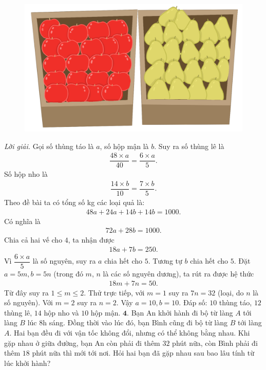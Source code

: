 \begin{multicols}{2}
	\begin{figure}[H]
		\centering
		\vspace*{-5pt}
		\captionsetup{labelformat= empty, justification=centering}
		\includegraphics[width=1\linewidth]{Pi3_bai3}
		\vspace*{-15pt}
	\end{figure}
	\textit{Lời giải.} Gọi số thùng táo là $a$, số hộp mận là $b$. Suy ra số thùng lê là 
	\begin{align*}
		\dfrac{48 \times a}{40} = \dfrac{6 \times a}{5}.
	\end{align*}
	Số hộp nho là
	\begin{align*}
		\dfrac{14 \times b}{10} = \dfrac{7 \times b}{5}.
	\end{align*}
	Theo đề bài ta có tổng số kg các loại quả là: 
	\begin{align*}
		48a+24a+14b+14b =1000. 
	\end{align*}
	Có nghĩa là
	\begin{align*}
		72a+28b=1000.
	\end{align*}
	Chia cả hai vế cho $4$, ta nhận được 
	\begin{align*}
		18a+7b=250.
	\end{align*}
	Vì $\dfrac{6 \times a}{5}$ là số nguyên, suy ra $a$ chia hết cho $5$. Tương tự $b$ chia hết cho $5$. Đặt $a = 5m,b=5n$ (trong đó $m$, $n$ là các số nguyên dương),  ta rút ra được hệ thức
	\begin{align*}
		18m+7n = 50.
	\end{align*}
	Từ đây suy ra $1\le m \le 2$.
	\vskip 0.1cm 
	Thử trực tiếp, với $m=1$ suy ra $7n=32$ (loại, do $n$ là số nguyên). 
	\vskip 0.1cm
	Với $m=2$ suy ra $n=2$. Vậy $a=10,b=10$.
	\vskip 0.1cm 
	Đáp số: $10$ thùng táo, $12$ thùng lê, $14$ hộp nho và $10$ hộp mận.
	\vskip 0.1cm
	$\pmb{4.}$ Bạn An khởi hành đi bộ từ làng $A$ tới làng $B$ lúc $8$h sáng. Đồng thời vào lúc đó, bạn Bình cũng đi bộ từ làng $B$ tới làng $A$. Hai bạn đều đi với vận tốc không đổi, nhưng có thể không bằng nhau. Khi gặp nhau ở giữa đường, bạn An còn phải đi thêm $32$ phút nữa, còn Bình phải đi thêm $18$ phút nữa thì mới tới nơi. Hỏi hai bạn đã gặp nhau sau bao lâu tính từ lúc khởi hành?

\end{multicols}
